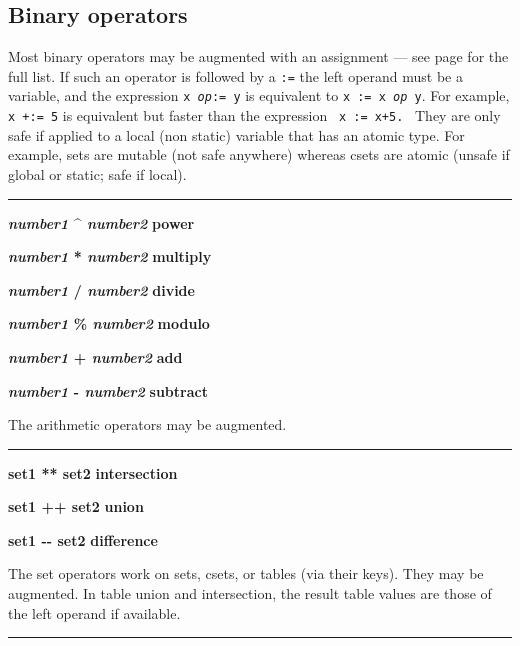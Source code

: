 \subsection*{Binary operators}

Most binary operators may be augmented with an
assignment
--- see page \pageref{AugOps} for the full list.
If such an operator is followed
by a \texttt{:=} the left operand must be a variable, and the
expression \texttt{x }\texttt{\textit{op}}\texttt{:= y} is equivalent
to \texttt{x := x }\texttt{\textit{op}}\texttt{ y}. For example,
\texttt{x +:= 5} is equivalent but faster than the expression
\ \texttt{x := x+5.}
 \
They are only safe if applied to a local (non static) variable that
has an atomic type. For example, sets are mutable (not safe anywhere)
whereas csets are atomic (unsafe if global or static; safe if local).

\bigskip\hrule\vspace{0.1cm}
\noindent
{\bf \textit{number1} \^{} \textit{number2} } \hfill {\bf power}
\index{power, exponent \^{}}

\noindent
{\bf \textit{number1} * \textit{number2} } \hfill {\bf multiply}

\noindent
{\bf \textit{number1} / \textit{number2} } \hfill {\bf divide}

\noindent
{\bf \textit{number1} \% \textit{number2} } \hfill {\bf modulo}

\noindent
{\bf \textit{number1} + \textit{number2} } \hfill {\bf add}

\noindent
{\bf \textit{number1} - \textit{number2} } \hfill {\bf subtract}

\noindent
The arithmetic operators may be augmented.

\bigskip\hrule\vspace{0.1cm}
\noindent
{\bf set1 ** set2 } \hfill {\bf intersection}

\noindent
{\bf set1 ++ set2 } \hfill {\bf union}

\noindent
{\bf set1 -{}- set2 } \hfill {\bf difference}

\noindent
The set operators work on sets, csets, or tables (via their keys).
They may be augmented. In table union and intersection, the result
table values are those of the left operand if available.

\bigskip\hrule\vspace{0.1cm}

